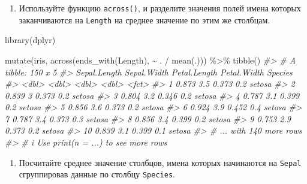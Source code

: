 \documentclass[
]{book}
\newenvironment{Shaded}{\begin{snugshade}}{\end{snugshade}}
\newcommand{\CommentTok}[1]{\textcolor[rgb]{0.56,0.35,0.01}{\textit{#1}}}
\newcommand{\FunctionTok}[1]{\textcolor[rgb]{0.00,0.00,0.00}{#1}}
\newcommand{\NormalTok}[1]{#1}
\newcommand{\SpecialCharTok}[1]{\textcolor[rgb]{0.00,0.00,0.00}{#1}}
\newcommand{\StringTok}[1]{\textcolor[rgb]{0.31,0.60,0.02}{#1}}
\providecommand{\tightlist}{%
  \setlength{\itemsep}{0pt}\setlength{\parskip}{0pt}}
\begin{document}
\begin{enumerate}
\def\labelenumi{\arabic{enumi}.}
\tightlist
\item
  Используйте функцию \texttt{across()}, и разделите значения полей имена которых заканчиваются на \texttt{Length} на среднее значение по этим же столбцам.
\end{enumerate}

\begin{Shaded}
\begin{Highlighting}[]
\FunctionTok{library}\NormalTok{(dplyr)}

\FunctionTok{mutate}\NormalTok{(iris, }\FunctionTok{across}\NormalTok{(}\FunctionTok{ends\_with}\NormalTok{(}\StringTok{\textquotesingle{}Length\textquotesingle{}}\NormalTok{), }\SpecialCharTok{\textasciitilde{}}\NormalTok{ . }\SpecialCharTok{/} \FunctionTok{mean}\NormalTok{(.))) }\SpecialCharTok{\%\textgreater{}\%} 
  \FunctionTok{tibble}\NormalTok{()}
\CommentTok{\#\textgreater{} \# A tibble: 150 x 5}
\CommentTok{\#\textgreater{}    Sepal.Length Sepal.Width Petal.Length Petal.Width Species}
\CommentTok{\#\textgreater{}           \textless{}dbl\textgreater{}       \textless{}dbl\textgreater{}        \textless{}dbl\textgreater{}       \textless{}dbl\textgreater{} \textless{}fct\textgreater{}  }
\CommentTok{\#\textgreater{}  1        0.873         3.5        0.373         0.2 setosa }
\CommentTok{\#\textgreater{}  2        0.839         3          0.373         0.2 setosa }
\CommentTok{\#\textgreater{}  3        0.804         3.2        0.346         0.2 setosa }
\CommentTok{\#\textgreater{}  4        0.787         3.1        0.399         0.2 setosa }
\CommentTok{\#\textgreater{}  5        0.856         3.6        0.373         0.2 setosa }
\CommentTok{\#\textgreater{}  6        0.924         3.9        0.452         0.4 setosa }
\CommentTok{\#\textgreater{}  7        0.787         3.4        0.373         0.3 setosa }
\CommentTok{\#\textgreater{}  8        0.856         3.4        0.399         0.2 setosa }
\CommentTok{\#\textgreater{}  9        0.753         2.9        0.373         0.2 setosa }
\CommentTok{\#\textgreater{} 10        0.839         3.1        0.399         0.1 setosa }
\CommentTok{\#\textgreater{} \# ... with 140 more rows}
\CommentTok{\#\textgreater{} \# i Use \textasciigrave{}print(n = ...)\textasciigrave{} to see more rows}
\end{Highlighting}
\end{Shaded}

\begin{enumerate}
\def\labelenumi{\arabic{enumi}.}
\setcounter{enumi}{1}
\tightlist
\item
  Посчитайте среднее значение столбцов, имена которых начинаются на \texttt{Sepal} сгруппировав данные по столбцу \texttt{Species}.
\end{enumerate}
\end{document}
